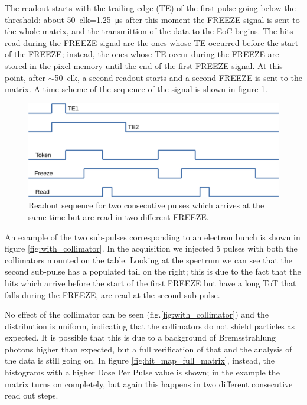    The readout starts with the trailing edge (TE) of the first pulse going below the threshold: about \SI{50}{clk}=\SI{1.25}{\us} after this moment the FREEZE signal is sent to the whole matrix, and the transmittion of the data to the EoC begins.
   The hits read during the FREEZE signal are the ones whose TE occurred before the start of the FREEZE; instead, the ones whose TE occur during the FREEZE are stored in the pixel memory until the end of the first FREEZE signal. At this point, after $\sim$\SI{50}{clk}, a second readout starts and a second FREEZE is sent to the matrix.  
   A time scheme of the sequence of the signal is shown in figure \ref{fig:time_scheme}.
   \begin{figure}
      \centering
      \includegraphics[width=0.8\linewidth]{figures/test_beam/time.pdf}
      \caption{Readout sequence for two consecutive pulses which arrives at the same time but are read in two different FREEZE.}
      \label{fig:time_scheme}
   \end{figure}

   An example of the two sub-pulses corresponding to an electron bunch is shown in figure \ref{fig:with_collimator}. In the acquisition we injected 5 pulses with both the collimators mounted on the table. 
   Looking at the spectrum we can see that the second sub-pulse has a populated tail on the right; this is due to the fact that the hits which arrive before the start of the first FREEZE but have a long ToT that falls during the FREEZE, are read at the second sub-pulse. 
   
   No effect of the collimator can be seen (fig.\ref{fig:with_collimator}) and the distribution is uniform, indicating that the collimators do not shield particles as expected.
   It is possible that this is due to a background of Bremsstrahlung photons higher than expected, but a full verification of that and the analysis of the data is still going on. 
   In figure \ref{fig:hit_map_full_matrix}, instead, the histograms with a higher Dose Per Pulse value is shown; in the example the matrix turns on completely, but again this happens in two different consecutive read out steps. 


